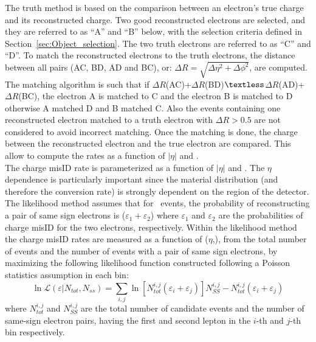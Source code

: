 The truth method is based on the comparison between an electron's true
charge and its reconstructed charge.
Two good reconstructed electrons are selected, and they are
referred to as ``A'' and ``B'' below, with the selection criteria defined in Section~\ref{sec:Object_selection}.
The two truth electrons are referred to as ``C'' and
``D''. To match the reconstructed electrons to the truth electrons, the distance 
between all pairs (AC, BD, AD and BC), or: 
$\Delta R = \sqrt{\Delta \eta^2 + \Delta \phi^2}$, are computed. 
The matching algorithm is such that if $\Delta R$(AC)+$\Delta R$(BD)$\textless$$\Delta
R$(AD)+$\Delta R$(BC), the electron A is matched to C and the electron B is matched to D
otherwise A matched D and B matched C. 
Also the events containing one reconstructed electron matched to a truth electron with $\Delta{}R>0.5$ are not considered to avoid incorrect
matching. 
Once the matching is done, the charge between the reconstructed electron and
the true electron are compared. This allow to compute the rates as a function of $|\eta|$ and \pt. \\
  
The charge misID rate is parameterized as a function of
$|\eta|$ and \pt. The $\eta$ dependence is particularly important since
the material distribution (and therefore the conversion rate) is
strongly dependent on the region of the detector. The likelihood method assumes that for \Zee\ events, the probability
of reconstructing a pair of same sign electrons is ($\varepsilon_1 +
\varepsilon_2$) where $\varepsilon_1$ and $\varepsilon_2$ are the
probabilities of charge misID for the two electrons,
respectively. Within the likelihood method the charge misID rates are measured as a function of ($\eta$,\pt), from
the total number of events and the number of events with a pair of
same sign electrons, by maximizing the following likelihood function
constructed following a Poisson statistics assumption in each bin: 
\begin{equation}
    \ln\mathcal{L}(\varepsilon|N_{tot},N_{ss}) =
    \sum_{i,j}\ln\left[N_{tot}^{i,j}(\varepsilon_{i}+\varepsilon_{j})\right] N_{SS}^{i,j}-N_{tot}^{i,j}(\varepsilon_{i}+\varepsilon_{j})
    \label{eq:lnL_chargeMisID}
\end{equation}
where $N_{tot}^{i,j}$ and $N_{SS}^{i,j}$ are the total number of
candidate events and the number of same-sign electron
pairs, having the first and second lepton in the $i$-th and $j$-th bin
respectively.

